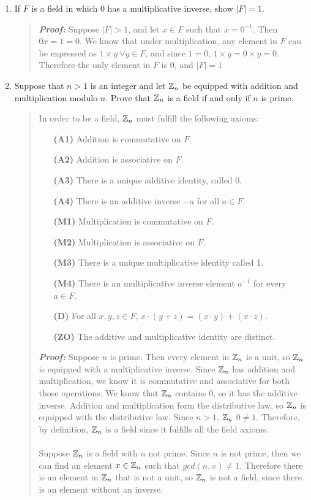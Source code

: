 \documentclass{hw}
\begin{document}

\begin{enumerate}
\item If $F$ is a field in which 0 has a multiplicative inverse, show $|F|=1$.
\begin{quote}
\textbf{\textit{Proof:}} Suppose $|F|>1$, and let $x\in F$ such that $x=0^{-1}$. Then $0x=1=0$. We know that under multiplication, any element in $F$ can be expressed as $1\times y\ \forall y\in F$, and since $1=0$, $1\times y = 0 \times y = 0$. Therefore the only element in $F$ is 0, and $|F|=1$
\end{quote}

\item Suppose that $n>1$ is an integer and let $\mathbb{Z}_{n}$ be equipped with addition and multiplication modulo $n$. Prove that $\mathbb{Z}_{n}$ is a field if and only if $n$ is prime.
\begin{quote}
In order to be a field, $\mathbb{Z}_{n}$ must fulfill the following axioms:
\begin{enumerate}
\item[\textbf{(A1)}] Addition is commutative on $F$.
\item[\textbf{(A2)}] Addition is associative on $F$.
\item[\textbf{(A3)}] There is a unique additive identity, called 0.
\item[\textbf{(A4)}] There is an additive inverse $-a$ for all $a\in F$.
\item[\textbf{(M1)}] Multiplication is commutative on $F$.
\item[\textbf{(M2)}] Multiplication is associative on $F$.
\item[\textbf{(M3)}] There is a unique multiplicative identity called 1.
\item[\textbf{(M4)}] There is an multiplicative inverse element $a^{-1}$ for every $a\in F$.
\item[\textbf{(D)}] For all $x,y,z\in F$, $x\cdot(y+z)=(x\cdot y)+(x\cdot z)$.
\item[\textbf{(ZO)}] The additive and multiplicative identity are distinct.
\end{enumerate}

\textbf{\textit{Proof:}} Suppose $n$ is prime. Then every element in $\mathbb{Z}_{n}$ is a unit, so $\mathbb{Z}_{n}$ is equipped with a multiplicative inverse. Since $\mathbb{Z}_{n}$ has addition and multiplication, we know it is commutative and associative for both those operations. We know that $\mathbb{Z}_{n}$ contains 0, so it has the additive inverse. Addition and multiplication form the distributive law, so $\mathbb{Z}_{n}$ is equipped with the distributive law. Since $n>1$, $\mathbb{Z}_{n}$ $0\neq1$. Therefore, by definition, $\mathbb{Z}_{n}$ is a field since it fulfills all the field axioms.\\\\
Suppose $\mathbb{Z}_{n}$ is a field with $n$ not prime. Since $n$ is not prime, then we can find an element $x\in\mathbb{Z}_{n}$ such that $gcd(n,x)\neq1$. Therefore there is an element in $\mathbb{Z}_{n}$ that is not a unit, so $\mathbb{Z}_{n}$ is not a field, since there is an element without an inverse.
\end{quote}


\end{enumerate}
\end{document}
